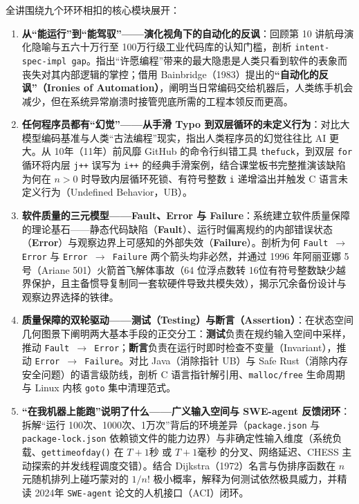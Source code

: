 \documentclass[a4paper]{article}
\begin{document}
全讲围绕九个环环相扣的核心模块展开：
\begin{enumerate}
    \item \textbf{从“能运行”到“能驾驭”——演化视角下的自动化的反讽}：回顾第 10 讲航母演化隐喻与五六十万行至 100万行级工业代码库的认知门槛，剖析 \texttt{intent-spec-impl gap}。指出“许愿编程”带来的最大隐患是人类只看到软件的表象而丧失对其内部逻辑的掌控；借用 Bainbridge（1983）提出的\textbf{“自动化的反讽”（Ironies of Automation）}，阐明当日常编码交给机器后，人类练手机会减少，但在系统异常崩溃时接管兜底所需的工程本领反而更高。
    \item \textbf{任何程序员都有“幻觉”——从手滑 Typo 到双层循环的未定义行为}：对比大模型编码基准与人类“古法编程”现实，指出人类程序员的幻觉往往比 AI 更大。从 10年（11年）前风靡 GitHub 的命令行纠错工具 \texttt{thefuck}，到双层 \texttt{for} 循环将内层 \texttt{j++} 误写为 \texttt{i++} 的经典手滑案例，结合课堂板书完整推演该缺陷为何在 $n > 0$ 时导致内层循环死锁、有符号整数 \texttt{i} 递增溢出并触发 C 语言未定义行为（Undefined Behavior，UB）。
    \item \textbf{软件质量的三元模型——Fault、Error 与 Failure}：系统建立软件质量保障的理论基石——静态代码缺陷（\textbf{Fault}）、运行时偏离规约的内部错误状态（\textbf{Error}）与观察边界上可感知的外部失效（\textbf{Failure}）。剖析为何 \texttt{Fault $\to$ Error} 与 \texttt{Error $\to$ Failure} 两个箭头均非必然，并通过 1996 年阿丽亚娜 5 号（Ariane 501）火箭首飞解体事故（64 位浮点数转 16位有符号整数缺少越界保护，且主备惯导复制同一套软硬件导致共模失效），揭示冗余备份设计与观察边界选择的铁律。
    \item \textbf{质量保障的双轮驱动——测试（Testing）与断言（Assertion）}：在状态空间几何图景下阐明两大基本手段的正交分工：\textbf{测试}负责在规约输入空间中采样，推动 \texttt{Fault $\to$ Error}；\textbf{断言}负责在运行时即时检查不变量（Invariant），推动 \texttt{Error $\to$ Failure}。对比 Java（消除指针 UB）与 Safe Rust（消除内存安全问题）的语言级防线，剖析 C 语言指针解引用、\texttt{malloc/free} 生命周期与 Linux 内核 \texttt{goto} 集中清理范式。
    \item \textbf{“在我机器上能跑”说明了什么——广义输入空间与 SWE-agent 反馈闭环}：拆解“运行 100次、1000次、1万次”背后的环境差异（\texttt{package.json} 与 \texttt{package-lock.json} 依赖锁文件的能力边界）与非确定性输入维度（系统负载、\texttt{gettimeofday()} 在 $T+1\text{秒}$ 或 $T+1\text{毫秒}$ 的分叉、网络延迟、CHESS 主动探索的并发线程调度交错）。结合 Dijkstra（1972）名言与伪排序函数在 $n$ 元随机排列上碰巧蒙对的 $1/n!$ 极小概率，解释为何测试依然极具威力，并精读 2024年 \texttt{SWE-agent} 论文的人机接口（ACI）闭环。

\end{enumerate}
\end{document}

